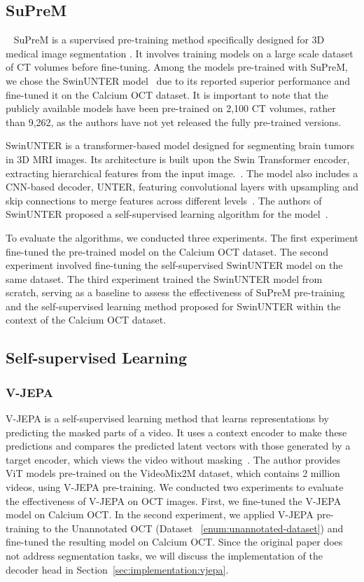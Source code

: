 \documentclass[a4paper,11pt,oneside]{report}
\begin{document}
\subsection{SuPreM}~\label{sec:design:suprem}
SuPreM is a supervised pre-training method specifically designed for 3D medical image segmentation \cite{Li2024}. It involves training models on a large scale dataset of CT volumes before fine-tuning. Among the models pre-trained with SuPreM, we chose the SwinUNTER model~\cite{Tang2022} due to its reported superior performance and fine-tuned it on the Calcium OCT dataset. It is important to note that the publicly available models have been pre-trained on 2,100 CT volumes, rather than 9,262, as the authors have not yet released the fully pre-trained versions.

SwinUNTER is a transformer-based model designed for segmenting brain tumors in 3D MRI images. Its architecture is built upon the Swin Transformer encoder, extracting hierarchical features from the input image.~\cite{Liu2021Swin}. The model also includes a CNN-based decoder, UNTER, featuring convolutional layers with upsampling and skip connections to merge features across different levels~\cite{Hatamizadeh2022}. The authors of SwinUNTER proposed a self-supervised learning algorithm for the model~\cite{Tang2022}. 

To evaluate the algorithms, we conducted three experiments. The first experiment fine-tuned the pre-trained model on the Calcium OCT dataset. The second experiment involved fine-tuning the self-supervised SwinUNTER model on the same dataset. The third experiment trained the SwinUNTER model from scratch, serving as a baseline to assess the effectiveness of SuPreM pre-training and the self-supervised learning method proposed for SwinUNTER within the context of the Calcium OCT dataset.

\subsection{Self-supervised Learning}
\subsubsection{V-JEPA}
V-JEPA is a self-supervised learning method that learns representations by predicting the masked parts of a video. It uses a context encoder to make these predictions and compares the predicted latent vectors with those generated by a target encoder, which views the video without masking~\cite{Bardes2024Vjepa}. The author provides ViT models pre-trained on the VideoMix2M dataset, which contains 2 million videos, using V-JEPA pre-training. We conducted two experiments to evaluate the effectiveness of V-JEPA on OCT images. First, we fine-tuned the V-JEPA model on Calcium OCT. In the second experiment, we applied V-JEPA pre-training to the Unannotated OCT (Dataset ~\ref{enum:unannotated-dataset}) and fine-tuned the resulting model on Calcium OCT. Since the original paper does not address segmentation tasks, we will discuss the implementation of the decoder head in Section~\ref{sec:implementation:vjepa}.
\end{document}
